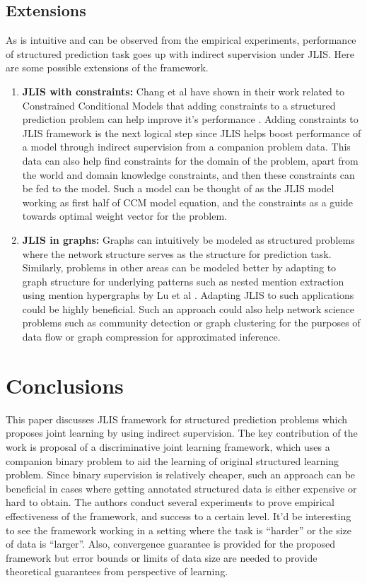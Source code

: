 \documentclass{acm_proc_article-sp}
\begin{document}
\subsection{Extensions}
\label{subsec:extensions}
As is intuitive and can be observed from the empirical experiments, performance of structured prediction task goes up with indirect supervision under JLIS. Here are some possible extensions of the framework.
\begin{enumerate}
\item \textbf{JLIS with constraints:} Chang et al have shown in their work related to Constrained Conditional Models that adding constraints to a structured prediction problem can help improve it's performance \cite{ccm}. Adding constraints to JLIS framework is the next logical step since JLIS helps boost performance of a model through indirect supervision from a companion problem data. This data can also help find constraints for the domain of the problem, apart from the world and domain knowledge constraints, and then these constraints can be fed to the model. Such a model can be thought of as the JLIS model working as first half of CCM model equation, and the constraints as a guide towards optimal weight vector for the problem.
\item \textbf{JLIS in graphs:} Graphs can intuitively be modeled as structured problems where the network structure serves as the structure for prediction task. Similarly, problems in other areas can be modeled better by adapting to graph structure for underlying patterns such as nested mention extraction using mention hypergraphs by Lu et al \cite{mention-hypergraph}. Adapting JLIS to such applications could be highly beneficial. Such an approach could also help network science problems such as community detection or graph clustering for the purposes of data flow or graph compression for approximated inference.

\end{enumerate}



\section{Conclusions}
\label{sec:conclusions}
This paper discusses JLIS framework for structured prediction problems which proposes joint learning by using indirect supervision. The key contribution of the work is proposal of a discriminative joint learning framework, which uses a companion binary problem to aid the learning of original structured learning problem. Since binary supervision is relatively cheaper, such an approach can be beneficial in cases where getting annotated structured data is either expensive or hard to obtain. The authors conduct several experiments to prove empirical effectiveness of the framework, and success to a certain level. It'd be interesting to see the framework working in a setting where the task is ``harder'' or the size of data is ``larger''. Also, convergence guarantee is provided for the proposed framework but error bounds or limits of data size are needed to provide theoretical guarantees from perspective of learning.
\end{document}
